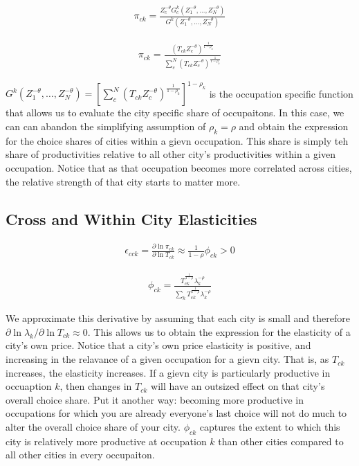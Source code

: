 \documentclass[10pt]{article}
\begin{document}
\begin{align}
    \pi_{ck} = \frac{Z_c^{- \theta} G_c^k(Z_1^{- \theta}, \dots, Z_N^{- \theta})}{G^k(Z_1^{- \theta}, \dots, Z_N^{- \theta})}
\end{align}

\begin{align}
    \pi_{ck} = \frac{(T_{ck} Z_c^{-\theta})^{\frac{1}{1 - \rho_k}}}{\sum_{c}^{N} (T_{ck} Z_c^{-\theta})^{\frac{1}{1 - \rho_k}}}
    \label{city_occuaption_shares}
\end{align}

$G^k (Z_1^{-\theta}, \dots, Z_N^{-\theta}) = [\sum_{c}^{N} (T_{ck} Z_c^{-\theta})^{\frac{1}{1 - \rho_k}}]^{1 - \rho_k}$ is the occupation specific function that allows us to evaluate the city specific share of occupaitons. In this case, we can can abandon the simplifying assumption of $\rho_k = \rho$ and obtain the expression for the choice shares of cities within a gievn occupation. This share is simply teh share of productivities relative to all other city's productivities within a given occupation. Notice that as that occupation becomes more correlated across cities, the relative strength of that city starts to matter more.

\subsection{Cross and Within City Elasticities}

\begin{align}
    \epsilon_{cck} = \frac{\partial \ln \pi_{ck}}{\partial \ln T_{ck}} \approx \frac{1}{1 - \rho} \phi_{ck} > 0
    \label{within_city_elasticity}
\end{align}

\begin{align}
    \phi_{ck} = \frac{T_{ck}^{\frac{1}{1 - \rho}} \lambda_k^{- \rho}}{\sum_{k}^{} T_{ck}^{\frac{1}{1 - \rho}} \lambda_k^{- \rho}}
\end{align}

We approximate this derivative by assuming that each city is small and therefore $\partial \ln \lambda_k / \partial \ln T_{ck} \approx 0$. This allows us to obtain the expression for the elasticity of a city's own price. Notice that a city's own price elasticity is positive, and increasing in the relavance of a given occupation for a gievn city. That is, as $T_{ck}$ increases, the elasticity increases. If a gievn city is particularly productive in occuaption $k$, then changes in $T_{ck}$ will have an outsized effect on that city's overall choice share. Put it another way: becoming more productive in occupations for which you are already everyone's last choice will not do much to alter the overall choice share of your city. $\phi_{ck}$ captures the extent to which this city is relatively more productive at occupation $k$ than other cities compared to all other cities in every occupaiton.
\end{document}
